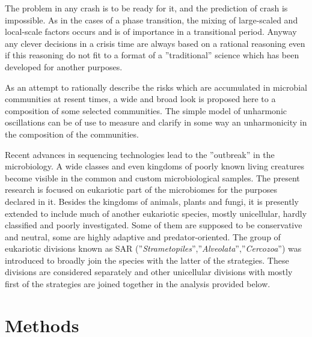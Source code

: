 \documentclass[a4paper]{article}
\begin{document}
The problem in any crash is to be ready for it, and the prediction of crash is impossible. As in the cases of a phase transition, the mixing of large-scaled and local-scale factors occurs and is of importance in a transitional period. Anyway any clever decisions in a crisis time are always based on a rational reasoning even if this reasoning do not fit to a format of a ''traditional'' science which has been developed for another purposes.

As an attempt to rationally describe the risks which are accumulated in microbial communities at resent times, a wide and broad look is proposed here to a composition of some selected communities. The simple model of unharmonic oscillations can be of use to measure and clarify in some way an unharmonicity in the composition of the communities.

Recent advances in sequencing technologies lead to the ''outbreak'' in the microbiology. A wide classes and even kingdoms of poorly known living creatures become visible in the common and custom microbiological samples. The present research is focused on eukariotic part of the microbiomes for the purposes declared in it. Besides the kingdoms of animals, plants and fungi, it is presently extended to include much of another eukariotic species, mostly unicellular, hardly classified and poorly investigated. Some of them are supposed to be conservative and neutral, some are highly adaptive and predator-oriented. The group of eukariotic divisions known as SAR (''\textit{Strametopiles}'',''\textit{Alveolata}'',''\textit{Cercozoa}'') was introduced to broadly join the species with the latter of the strategies. These divisions are considered separately and other unicellular divisions with mostly first of the strategies are joined together in the analysis provided below.


\section*{Methods} 

\end{document}
